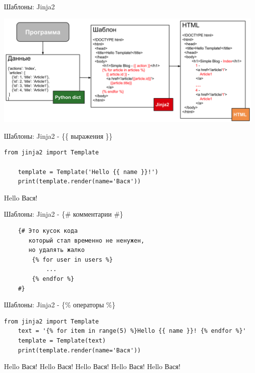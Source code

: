 \begin{frame}{Шаблоны: Jinja2}

  \begin{center}
    \includegraphics[width=\textwidth,height=\textheight,keepaspectratio]{media/template.png}
  \end{center}

\end{frame}

\begin{frame}[fragile]{Шаблоны: Jinja2 - \{\{ выражения \}\}}

  \begin{lstlisting}[style=Python]
    from jinja2 import Template

    template = Template('Hello {{ name }}!')
    print(template.render(name='Вася'))
  \end{lstlisting}

  Hello Вася!

\end{frame}

\begin{frame}[fragile]{Шаблоны: Jinja2 - \{\# комментарии \#\}}

  \begin{lstlisting}
    {# Это кусок кода
       который стал временно не ненужен,
       но удалять жалко
        {% for user in users %}
            ...
        {% endfor %}
    #}
  \end{lstlisting}

\end{frame}

\begin{frame}[fragile]{Шаблоны: Jinja2 - \{\% операторы \%\}}

  \begin{lstlisting}[style=Python]
    from jinja2 import Template
    text = '{% for item in range(5) %}Hello {{ name }}! {% endfor %}'
    template = Template(text)
    print(template.render(name='Вася'))
  \end{lstlisting}

  Hello Вася! Hello Вася! Hello Вася! Hello Вася! Hello Вася!

\end{frame}

